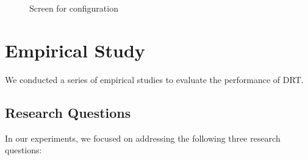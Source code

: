\documentclass[10pt,journal,compsoc]{IEEEtran}
\begin{document}
\begin{figure}
  \centering
  \caption{Screen for configuration}
  \label{fig:configuration}
\end{figure}


\section{Empirical Study}
\label{sec:empiricalstudy}

We conducted a series of empirical studies to evaluate the performance of DRT.

\subsection{Research Questions}
\label{sec:questions}

In our experiments, we focused on addressing the following three research questions:
\end{document}
